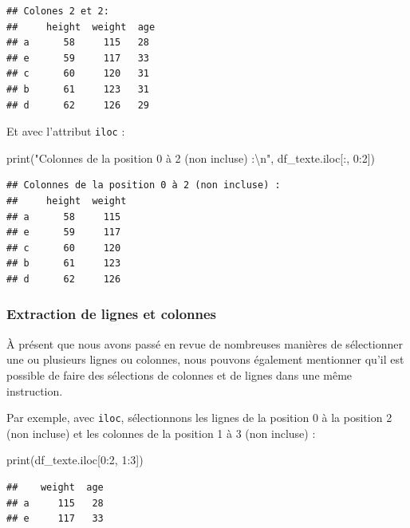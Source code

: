 \documentclass[12pt,]{book}
\newenvironment{Shaded}{\begin{snugshade}}{\end{snugshade}}
\newcommand{\DecValTok}[1]{\textcolor[rgb]{0.00,0.00,0.81}{#1}}
\newcommand{\CharTok}[1]{\textcolor[rgb]{0.31,0.60,0.02}{#1}}
\newcommand{\StringTok}[1]{\textcolor[rgb]{0.31,0.60,0.02}{#1}}
\newcommand{\BuiltInTok}[1]{#1}
\newcommand{\NormalTok}[1]{#1}
\numberwithin{equation}{section}
\numberwithin{countremarque}{section}
\begin{document}
\begin{lstlisting}
## Colones 2 et 2:
##     height  weight  age
## a      58     115   28
## e      59     117   33
## c      60     120   31
## b      61     123   31
## d      62     126   29
\end{lstlisting}

Et avec l'attribut \texttt{iloc} :

\begin{Shaded}
\begin{Highlighting}[]
\BuiltInTok{print}\NormalTok{(}\StringTok{"Colonnes de la position 0 à 2 (non incluse) :}\CharTok{\textbackslash{}n}\StringTok{"}\NormalTok{, }
\NormalTok{      df_texte.iloc[:, }\DecValTok{0}\NormalTok{:}\DecValTok{2}\NormalTok{])}
\end{Highlighting}
\end{Shaded}

\begin{lstlisting}
## Colonnes de la position 0 à 2 (non incluse) :
##     height  weight
## a      58     115
## e      59     117
## c      60     120
## b      61     123
## d      62     126
\end{lstlisting}

\subsubsection{Extraction de lignes et
colonnes}\label{extraction-de-lignes-et-colonnes}

À présent que nous avons passé en revue de nombreuses manières de
sélectionner une ou plusieurs lignes ou colonnes, nous pouvons également
mentionner qu'il est possible de faire des sélections de colonnes et de
lignes dans une même instruction.

Par exemple, avec \texttt{iloc}, sélectionnons les lignes de la position
0 à la position 2 (non incluse) et les colonnes de la position 1 à 3
(non incluse) :

\begin{Shaded}
\begin{Highlighting}[]
\BuiltInTok{print}\NormalTok{(df_texte.iloc[}\DecValTok{0}\NormalTok{:}\DecValTok{2}\NormalTok{, }\DecValTok{1}\NormalTok{:}\DecValTok{3}\NormalTok{])}
\end{Highlighting}
\end{Shaded}

\begin{lstlisting}
##    weight  age
## a     115   28
## e     117   33
\end{lstlisting}
\end{document}
